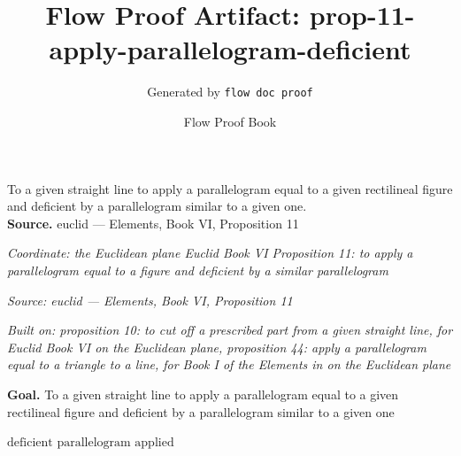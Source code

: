 \documentclass[11pt]{article}
\title{Flow Proof Artifact: prop-11-apply-parallelogram-deficient}
\author{Generated by \texttt{flow doc proof}}
\date{Flow Proof Book}
\theoremstyle{definition}
\begin{document}
\maketitle
To a given straight line to apply a parallelogram equal to a given rectilineal figure and deficient by a parallelogram similar to a given one.\\[0.5em]
\textbf{Source.} euclid — Elements, Book VI, Proposition 11\\[0.5em]
\bigskip
{}\par
\smallskip\noindent\textit{Coordinate: the Euclidean plane \cdot Euclid Book VI \cdot Proposition 11: to apply a parallelogram equal to a figure and deficient by a similar parallelogram}\par
\smallskip\noindent\textit{Source: euclid — Elements, Book VI, Proposition 11}\par
\smallskip\noindent\textit{Built on: proposition 10: to cut off a prescribed part from a given straight line, for Euclid Book VI on the Euclidean plane, proposition 44: apply a parallelogram equal to a triangle to a line, for Book I of the Elements in on the Euclidean plane}\par
\medskip
\noindent\textbf{Goal.} To a given straight line to apply a parallelogram equal to a given rectilineal figure and deficient by a parallelogram similar to a given one\par
\noindent$\displaystyle \text{deficient parallelogram applied}$\par
\medskip
\noindent
\end{document}
